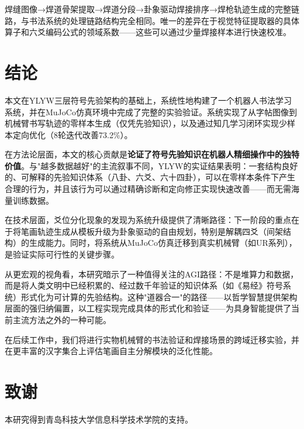 \documentclass[12pt,a4paper]{article}
\begin{document}
焊缝图像→焊道骨架提取→焊道分段→卦象驱动焊接排序→焊枪轨迹生成的完整链路，与书法系统的处理链路结构完全相同。唯一的差异在于视觉特征提取器的具体算子和六爻编码公式的领域系数——这些可以通过少量焊接样本进行快速校准。

\section{结论}

本文在YLYW三层符号先验架构的基础上，系统性地构建了一个机器人书法学习系统，并在MuJoCo仿真环境中完成了完整的实验验证。系统实现了从字帖图像到机械臂书写轨迹的零样本生成（仅凭先验知识），以及通过知几学习闭环实现少样本定向优化（8轮迭代改善73.2\%）。

在方法论层面，本文的核心贡献是\textbf{论证了符号先验知识在机器人精细操作中的独特价值}。与"越多数据越好"的主流叙事不同，YLYW的实证结果表明：一套结构良好的、可解释的先验知识体系（八卦、六爻、六十四卦），可以在零样本条件下产生合理的行为，并且该行为可以通过精确诊断和定向修正实现快速改善——而无需海量训练数据。

在技术层面，爻位分化现象的发现为系统升级提供了清晰路径：下一阶段的重点在于将笔画轨迹生成从模板升级为卦象驱动的自由规划，特别是解耦四爻（间架结构）的生成能力。同时，将系统从MuJoCo仿真迁移到真实机械臂（如UR系列），是验证实际可行性的关键步骤。

从更宏观的视角看，本研究暗示了一种值得关注的AGI路径：不是堆算力和数据，而是将人类文明中已经积累的、经过数千年验证的知识体系（如《易经》符号系统）形式化为可计算的先验结构。这种"道器合一"的路径——以哲学智慧提供架构层面的强归纳偏置，以工程实现完成具体的形式化和验证——为具身智能提供了当前主流方法之外的一种可能。

在后续工作中，我们将进行实物机械臂的书法验证和焊接场景的跨域迁移实验，并在更丰富的汉字集合上评估笔画自主分解模块的泛化性能。

\section*{致谢}
本研究得到青岛科技大学信息科学技术学院的支持。

\end{document}
